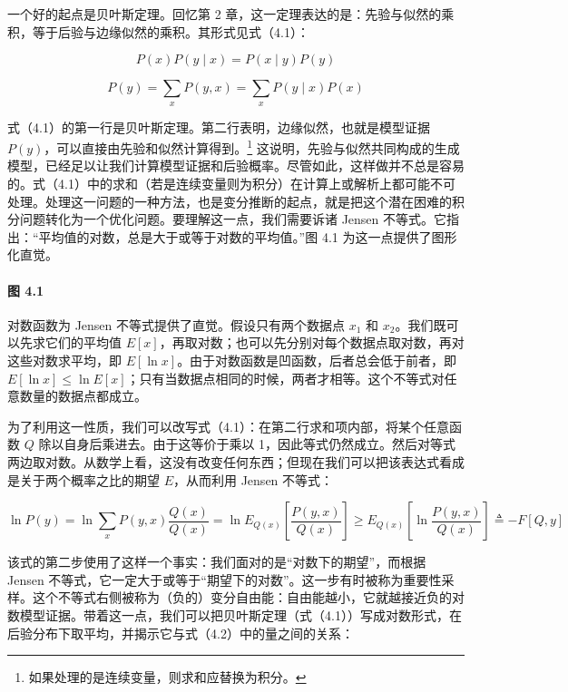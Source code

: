 一个好的起点是贝叶斯定理。回忆第 2 章，这一定理表达的是：先验与似然的乘积，等于后验与边缘似然的乘积。其形式见式（4.1）：

\begin{equation}
P(x)P(y \mid x) = P(x \mid y)P(y)
\tag{4.1}
\end{equation}

\begin{equation}
P(y) = \sum_x P(y, x) = \sum_x P(y \mid x)P(x)
\tag{4.1}
\end{equation}

式（4.1）的第一行是贝叶斯定理。第二行表明，边缘似然，也就是模型证据 $P(y)$，可以直接由先验和似然计算得到。\footnote{如果处理的是连续变量，则求和应替换为积分。} 这说明，先验与似然共同构成的生成模型，已经足以让我们计算模型证据和后验概率。尽管如此，这样做并不总是容易的。式（4.1）中的求和（若是连续变量则为积分）在计算上或解析上都可能不可处理。处理这一问题的一种方法，也是变分推断的起点，就是把这个潜在困难的积分问题转化为一个优化问题。要理解这一点，我们需要诉诸 Jensen 不等式。它指出：“平均值的对数，总是大于或等于对数的平均值。”图 4.1 为这一点提供了图形化直觉。

\paragraph{图 4.1}
对数函数为 Jensen 不等式提供了直觉。假设只有两个数据点 $x_1$ 和 $x_2$。我们既可以先求它们的平均值 $E[x]$，再取对数；也可以先分别对每个数据点取对数，再对这些对数求平均，即 $E[\ln x]$。由于对数函数是凹函数，后者总会低于前者，即 $E[\ln x] \le \ln E[x]$；只有当数据点相同的时候，两者才相等。这个不等式对任意数量的数据点都成立。

为了利用这一性质，我们可以改写式（4.1）：在第二行求和项内部，将某个任意函数 $Q$ 除以自身后乘进去。由于这等价于乘以 1，因此等式仍然成立。然后对等式两边取对数。从数学上看，这没有改变任何东西；但现在我们可以把该表达式看成是关于两个概率之比的期望 $E$，从而利用 Jensen 不等式：

\begin{equation}
\ln P(y)
= \ln \sum_x P(y, x)\frac{Q(x)}{Q(x)}
= \ln E_{Q(x)}\!\left[\frac{P(y, x)}{Q(x)}\right]
\ge E_{Q(x)}\!\left[\ln \frac{P(y, x)}{Q(x)}\right]
\triangleq -F[Q, y]
\tag{4.2}
\end{equation}

该式的第二步使用了这样一个事实：我们面对的是“对数下的期望”，而根据 Jensen 不等式，它一定大于或等于“期望下的对数”。这一步有时被称为重要性采样。这个不等式右侧被称为（负的）变分自由能：自由能越小，它就越接近负的对数模型证据。带着这一点，我们可以把贝叶斯定理（式（4.1））写成对数形式，在后验分布下取平均，并揭示它与式（4.2）中的量之间的关系：

